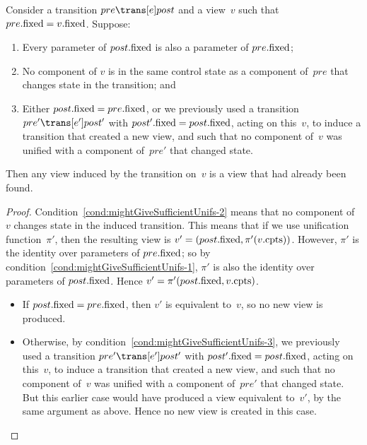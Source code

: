 
\begin{lemma}\label{lem:mightGiveSufficientUnifs}
Consider a transition $pre \trans[e] post$ and a view~$v$ such that
$pre.\mathrm{fixed} = v.\mathrm{fixed}$.   Suppose:
%
\begin{enumerate}
\item\label{cond:mightGiveSufficientUnifs-1}
  Every parameter of $post.\mathrm{fixed}$ is also a parameter of $pre.\mathrm{fixed}$;

\item\label{cond:mightGiveSufficientUnifs-2}
  No component of $v$ is in the same control state as a component of~$pre$
  that changes state in the transition; and

\item\label{cond:mightGiveSufficientUnifs-3}
  Either $post.\mathrm{fixed} = pre.\mathrm{fixed}$, or we previously used a transition
  $pre' \trans[e'] post'$ with $post'.\mathrm{fixed} = post.\mathrm{fixed}$, acting on
  this~$v$, to induce a transition that created a new view, and such that no
  component of~$v$ was unified with a component of~$pre'$ that changed state.
\end{enumerate}
%
Then any view induced by the transition on~$v$ is a view that had already been
found. 
\end{lemma}


\begin{proof}
Condition~\ref{cond:mightGiveSufficientUnifs-2}  means that no
component of~$v$ changes state in the induced transition.  This means that if
we use unification function~$\pi'$, then the resulting view is $v' =
(post.\mathrm{fixed}, \pi'(v.\mathrm{cpts}))$.
%
However, $\pi'$ is the identity over parameters of $pre.\mathrm{fixed}$; so by
condition~\ref{cond:mightGiveSufficientUnifs-1}, $\pi'$ is also the identity
over parameters of $post.\mathrm{fixed}$.  Hence $v' = \pi'(post.\mathrm{fixed}, v.\mathrm{cpts})$.
%
\begin{itemize}
\item If $post.\mathrm{fixed} = pre.\mathrm{fixed}$, then $v'$ is equivalent to~$v$, so no new
  view is produced.

\item Otherwise, by condition~\ref{cond:mightGiveSufficientUnifs-3}, we
  previously used a transition $pre' \trans[e'] post'$ with $post'.\mathrm{fixed} =
  post.\mathrm{fixed}$, acting on this~$v$, to induce a transition that created a new
  view, and such that no component of~$v$ was unified with a component
  of~$pre'$ that changed state.  But this earlier case would have produced a
  view equivalent to~$v'$, by the same argument as above.  Hence no new view
  is created in this case.
\end{itemize}
\end{proof}

